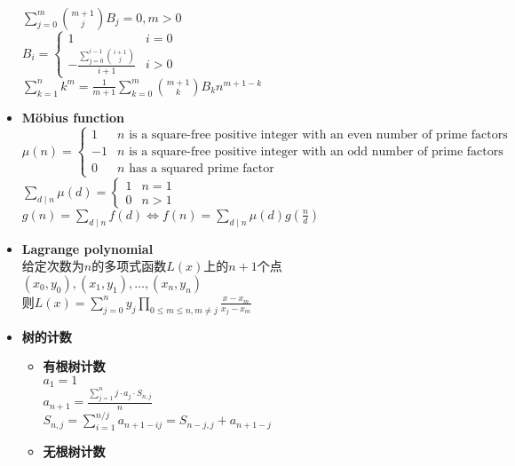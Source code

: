 \begin{itemize}
        \\$ \sum\limits_{j = 0}^{m} \binom{m + 1}{j} B_j = 0, m > 0 $
        \\$ B_i = \begin{cases}
            1 & i = 0\\
            -\frac{\sum\limits_{j = 0}^{i - 1} \binom{i + 1}{j}}{i + 1} & i > 0
        \end{cases} $
        \\$ \sum\limits_{k = 1}^{n} k ^ m = \frac{1}{m + 1} \sum\limits_{k = 0}^{m} \binom{m + 1}{k} B_k n ^ {m + 1 - k} $
    \item \textbf{Möbius function}
        \\$ \mu(n) = \begin{cases}
            1 & n \text{ is a square-free positive integer with an even number of prime factors}\\
            -1 & n \text{ is a square-free positive integer with an odd number of prime factors}\\
            0 & n \text{ has a squared prime factor}
        \end{cases} $
        \\$ \sum\limits_{d \mid n} \mu(d) = \begin{cases}
            1 & n = 1\\
            0 & n > 1
        \end{cases} $
        \\$ g(n) = \sum\limits_{d \mid n} f(d) \Leftrightarrow f(n) = \sum\limits_{d \mid n} \mu(d) g(\frac{n}{d}) $
    \item \textbf{Lagrange polynomial}
        \\给定次数为$ n $的多项式函数$ L(x) $上的$ n + 1 $个点$ (x_0, y_0), (x_1, y_1), \dots, (x_n, y_n) $
        \\则$ L(x) = \sum\limits_{j = 0}^{n} y_j \prod\limits_{0 \leq m \leq n, m \ne j} \frac{x - x_m}{x_j - x_m} $
    \item \textbf{树的计数}
        \begin{itemize}
            \item \textbf{有根树计数}
                \\$ a_1 = 1 $
                \\$ a_{n + 1} = \frac{\sum\limits_{j = 1}^{n} j \cdot a_j \cdot S_{n, j}}{n} $
                \\$ S_{n, j} = \sum\limits_{i = 1}^{n / j} a_{n + 1 - ij} = S_{n - j, j} + a_{n + 1 - j} $
            \item \textbf{无根树计数}

\end{itemize}
\end{itemize}
